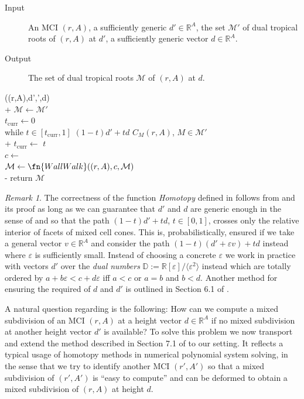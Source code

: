 \documentclass[a4paper]{article}
\theoremstyle{remark}
\newtheorem{remark}{Remark}
\def\RR{\mathbb{R}}
\def\DN{\mathbb{D}}
\begin{document}
\begin{algorithm}
  \begin{description}
  \item[Input] An MCI $(r,A)$, a sufficiently generic $d'\in \RR^A$,
    the set $\mathcal{M}'$ of dual tropical roots of $(r,A)$ at
    $d'$, a sufficiently generic vector $d\in \RR^A$.
  \item[Output] The set of dual tropical roots $\mathcal{M}$ of $(r,A)$ at $d$.
  \end{description}
  \begin{pseudo}
     ((r,A),d',',d)\\+
    $\mathcal{M}\gets \mathcal{M}'$\\
    $t_{\text{curr}}\gets 0$\\
    while  $t\in [t_{\text{curr}},1]$  $(1-t)d'+td$  $C_M(r,A)$, $M\in \mathcal{M}'$\\+
    $t_{\text{curr}}\gets $  $t$\\
    $c\gets$ \\
    $\mathcal{M}\gets \fn{WallWalk}((r,A),c,\mathcal{M})$\\-
    return $\mathcal{M}$
  \end{pseudo}
\end{algorithm}

\begin{remark}
  \label{rem:sympert}
  The correctness of the function \textit{Homotopy} defined in
   follows from  and its
  proof as long as we can guarantee that $d'$ and $d$ are generic enough
  in the sense of  and so that the path $(1-t)d' + td$,
  $t\in [0,1]$, crosses only the relative interior of facets of mixed
  cell cones. This is, probabilistically, ensured if we take a general
  vector $v\in \RR^A$ and consider the path
  $(1-t)(d'+\varepsilon v) + td$ instead where $\varepsilon$ is sufficiently
  small. Instead of choosing a concrete $\varepsilon$ we work in practice with
  vectors $d'$ over the {\em dual numbers}
  $\DN := \RR[\varepsilon]/\langle \varepsilon^2\rangle$ instead which are totally ordered by
  $a + b\varepsilon < c + d\varepsilon$ iff $a < c$ or $a = b$ and $b < d$.  Another
  method for ensuring the required of $d$ and $d'$ is
  outlined in Section 6.1 of
  \cite{jensenTropicalHomotopyContinuation2016}.
\end{remark}

A natural question regarding  is the following: How can
we compute a mixed subdivision of an MCI $(r,A)$ at a height vector
$d\in \RR^A$ if no mixed subdivision at another height vector $d'$ is
available? To solve this problem we now transport and extend the
method described in Section 7.1 of
\cite{jensenTropicalHomotopyContinuation2016} to our setting. It
reflects a typical usage of homotopy methods in numerical polynomial
system solving, in the sense that we try to identify another MCI $(r',A')$
so that a mixed subdivision of $(r',A')$ is ``easy to compute'' and can
be deformed to obtain a mixed subdivision of $(r, A)$ at height $d$.
\end{document}
